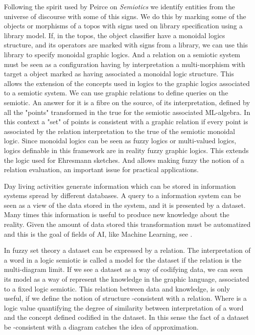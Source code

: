 \documentclass[oribibl]{llncs}
\begin{document}
Following the spirit used by Peirce on \emph{Semiotics} we identify entities from the universe of discourse with some of this signs. We do this
by marking some of the objects or morphisms of a topos with
signs used on library specification using a library model. If, in the topos, the object classifier have a monoidal logics structure, and its operators are marked with signs from a library, we can use this library to specify monoidal
graphic logics. And a relation on a semiotic system must be seen as a
configuration having by interpretation a multi-morphism with target
a object marked as having associated a monoidal logic structure.
This allows the extension of the concepts used in logics to the
graphic logics associated to a semiotic system. We can use graphic
relations to define queries on the semiotic. An answer for it is a
fibre on the source, of its interpretation, defined by all the
"points" transformed in the true for the semiotic associated
ML-algebra. In this context a "set" of points is consistent with a
graphic relation if every point is associated by the relation
interpretation to the true of the semiotic monoidal logic. Since
monoidal logics can be seen as fuzzy logics or multi-valued logics,
logics definable in this framework are in reality fuzzy graphic
logics. This extends the logic used for Ehresmann sketches. And
allows making fuzzy the notion of a relation evaluation, an
important issue for practical applications.

Day living activities generate information which can be stored in information systems spread by different databases.  A query to a information system can be seen as a view of the data stored in the system, and it is presented by a dataset. Many times this information is useful to produce new knowledge about the reality. Given the amount of data stored this transformation must be automatized and this is the goal of fields of AI, like Machine Learning, see \cite{Michell86}.

In fuzzy set theory a dataset can be expressed by a relation. The interpretation of a word in a logic semiotic is called a model for the dataset if the relation is the multi-diagram limit. If we see a dataset as a way of codifying data, we can seen its model as a way of represent the knowledge in the graphic language, associated to a fixed logic semiotic. This relation between data and knowledge, is only useful, if we define the notion of structure -consistent with a relation. Where  is a logic value quantifying the degree of similarity between interpretation of a word and the concept defined codified in the dataset. In this sense the fact of a dataset be -consistent with a diagram catches the idea of approximation.
\end{document}

